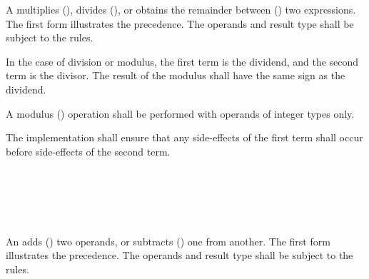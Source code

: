 
\begin{grammar}
 \\
	 \\
	 \terminal{*}  \\
	 \terminal{/}  \\
	 \terminal{\%}  \\
\end{grammar}

\specsubsubitem
A  multiplies (\terminal{*}), divides
(\terminal{/}), or obtains the remainder between (\terminal{\%}) two
expressions. The first form illustrates the precedence. The operands and result
type shall be subject to the  rules.

\specsubsubitem
In the case of division or modulus, the first term is the dividend, and the
second term is the divisor. The result of the modulus shall have the same sign
as the dividend.

\specsubsubitem
A modulus (\terminal{\%}) operation shall be performed with operands of integer
types only.

\specsubsubitem
The implementation shall ensure that any side-effects of the first term shall
occur before side-effects of the second term.


\begin{grammar}
 \\
	 \\
	 \terminal{+}  \\
	 \terminal{-}  \\
\end{grammar}

\specsubsubitem
An  adds (\terminal{+}) two operands, or
subtracts (\terminal{-}) one from another. The first form illustrates the
precedence. The operands and result type shall be subject to the  rules.

